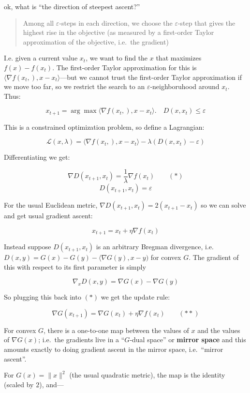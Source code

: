 ok, what is ``the direction of steepest ascent?''

\begin{quote}
Among all \(\varepsilon\)-steps in each direction, we choose the \(\varepsilon\)-step that gives the highest rise in the objective (as measured by a first-order Taylor approximation of the objective, i.e.~the gradient)
\end{quote}

I.e. given a current value \(x_t\), we want to find the \(x\) that maximizes \(f(x)-f(x_t)\). The first-order Taylor approximation for this is \(\langle\nabla f(x_t,), x-x_t\rangle\)---but we cannot trust the first-order Taylor approximation if we move too far, so we restrict the search to an \(\varepsilon\)-neighboruhood around \(x_t\). Thus:

\[x_{t+1}=\arg\max\langle\nabla f(x_t,), x-x_t\rangle. \quad D(x, x_t)\le\varepsilon\]

This is a constrained optimization problem, so define a Lagrangian:

\[\mathcal{L}(x,\lambda)= \langle\nabla f(x_t,), x-x_t\rangle - \lambda (D(x, x_t)-\varepsilon)\]

Differentiating we get:

\[\nabla D(x_{t+1}, x_t) = \frac1\lambda \nabla f(x_t) \quad\quad (*)\] \[D(x_{t+1}, x_t)=\varepsilon\]

For the usual Euclidean metric, \(\nabla D(x_{t+1}, x_t) = 2(x_{t+1}-x_t)\) so we can solve and get usual gradient ascent:

\[x_{t+1} = x_t + \eta \nabla f(x_t) \]

Instead suppose \(D(x_{t+1}, x_t)\) is an arbitrary Bregman divergence, i.e.~\(D(x, y) = G(x) - G(y) - \langle \nabla G(y), x-y)\) for convex \(G\). The gradient of this with respect to its first parameter is simply

\[\nabla_x D(x, y) = \nabla G(x) - \nabla G(y)\]

So plugging this back into \((*)\) we get the update rule:

\[\nabla G(x_{t+1}) = \nabla G(x_t) + \eta\nabla f(x_t)\quad\quad (**)\]

For convex \(G\), there is a one-to-one map between the values of \(x\) and the values of \(\nabla G(x)\); i.e.~the gradients live in a ``\(G\)-dual space'' or \textbf{mirror space} and this amounts exactly to doing gradient ascent in the mirror space, i.e.~``mirror ascent''.

For \(G(x)= \|x\|^2\) (the usual quadratic metric), the map is the identity (scaled by \(2\)), and---

